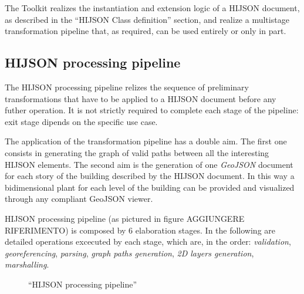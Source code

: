 \documentclass{sig-alternate}
\begin{document}
The Toolkit realizes the instantiation and extension logic of a HIJSON
document, as described in the ``HIJSON Class definition'' section, and
realize a multistage transformation pipeline that, as required, can be
used entirely or only in part.

\subsection{HIJSON processing pipeline}\label{hijson-processing-pipeline}

The HIJSON processing pipeline relizes the sequence of preliminary
transformations that have to be applied to a HIJSON document before any
futher operation. It is not strictly required to complete each stage of
the pipeline: exit stage dipends on the specific use case.

The application of the transformation pipeline has a double aim. The
first one consists in generating the graph of valid paths between all
the interesting HIJSON elements. The second aim is the generation of one
\emph{GeoJSON} document for each story of the building described by the
HIJSON document. In this way a bidimensional plant for each level of the
building can be provided and visualized through any compliant GeoJSON
viewer.

HIJSON processing pipeline (as pictured in figure AGGIUNGERE
RIFERIMENTO) is composed by 6 elaboration stages. In the following are
detailed operations excecuted by each stage, which are, in the order:
\emph{validation}, \emph{georeferencing}, \emph{parsing}, \emph{graph
paths generation}, \emph{2D layers generation}, \emph{marshalling}.

\begin{figure}[!htbp]
\centering
{}
\caption{``HIJSON processing pipeline''}
\label{fig:pipeline}
\end{figure}
\end{document}
